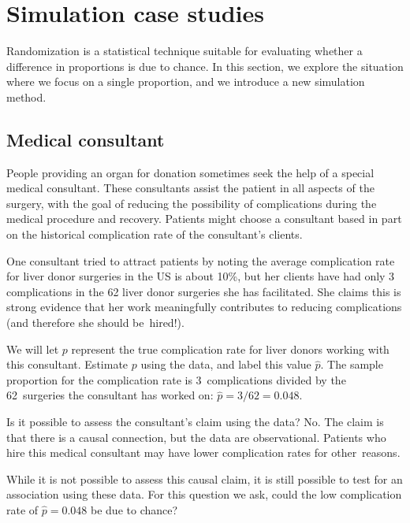 \section{Simulation case studies}
\label{SimulationCaseStudies}

Randomization is a statistical technique suitable for evaluating whether a difference in proportions is due to chance. In this section, we explore the situation where we focus on a single proportion, and we introduce a new simulation method.

\subsection{Medical consultant}

People providing an organ for donation sometimes seek the help of a special medical consultant. These consultants assist the patient in all aspects of the surgery, with the goal of reducing the possibility of complications during the medical procedure and recovery. Patients might choose a consultant based in part on the historical complication rate of the consultant's clients.

One consultant tried to attract patients by noting the average complication rate for liver donor surgeries in the US is about 10\%, but her clients have had only 3 complications in the 62 liver donor surgeries she has facilitated. She claims this is strong evidence that her work meaningfully contributes to reducing complications (and therefore she should be~hired!).

\begin{example}{We will let $p$ represent the true complication rate for liver donors working with this consultant. Estimate $p$ using the data, and label this value $\hat{p}$.}
The sample proportion for the complication rate is 3~complications divided by the 62~surgeries the consultant has worked on: $\hat{p} = 3/62 = 0.048$.
\end{example}

\begin{example}{Is it possible to assess the consultant's claim using the data?}
No. The claim is that there is a causal connection, but the data are observational. Patients who hire this medical consultant may have lower complication rates for other~reasons.

While it is not possible to assess this causal claim, it is still possible to test for an association using these data. For this question we ask, could the low complication rate of $\hat{p} = 0.048$ be due to chance?
\end{example}

